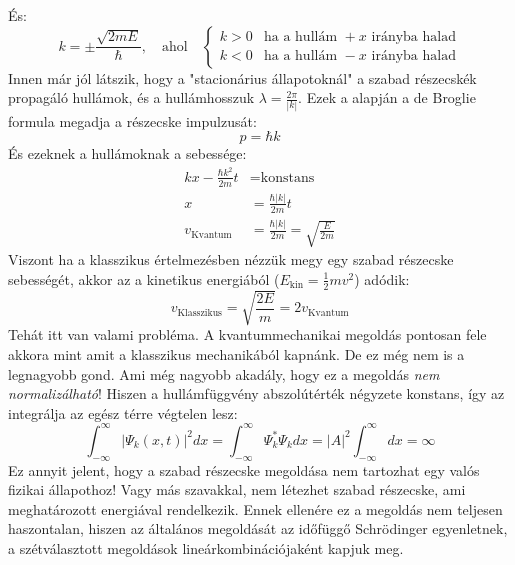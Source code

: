 \documentclass[../main.tex]{subfiles}
\begin{document}
És:
 \begin{equation}
    k =  \pm \frac{\sqrt{2mE}}{\hbar}, \quad \text{ahol} \quad \begin{cases}
    k > 0 & \text{ha a hullám } +x \text{ irányba halad} \\
    k < 0 & \text{ha a hullám } -x \text{ irányba halad}
    \end{cases}
 \end{equation}
Innen már jól látszik, hogy a "stacionárius állapotoknál" a szabad részecskék propagáló hullámok, és a hullámhosszuk $\lambda = \frac{2 \pi}{|k|}$.
Ezek a alapján a de Broglie formula megadja a részecske impulzusát:
\begin{equation}
    p = \hbar k
\end{equation}
És ezeknek a hullámoknak a sebessége:
\begin{equation}
    \begin{aligned}
        kx - \frac{\hbar k^2}{2m}t &= \text{konstans} \\
        x &= \frac{\hbar |k|}{2m} t \\
        v_{\text{Kvantum}} &= \frac{\hbar |k|}{2m} = \sqrt{\frac{E}{2m}}
    \end{aligned}
\end{equation}
Viszont ha a klasszikus értelmezésben nézzük megy egy szabad részecske sebességét, akkor az a kinetikus energiából ($E_{\text{kin}} = \frac{1}{2} m v^2$) adódik:
\begin{equation}
    v_{\text{Klasszikus}} = \sqrt{\frac{2E}{m}} = 2 v_{\text{Kvantum}}
\end{equation}
Tehát itt van valami probléma. A kvantummechanikai megoldás pontosan fele akkora mint amit a klasszikus mechanikából kapnánk. De ez még nem is a legnagyobb gond. Ami még nagyobb akadály,
hogy ez a megoldás \textit{nem normalizálható}! Hiszen a hullámfüggvény abszolútérték négyzete konstans, így az integrálja az egész térre végtelen lesz:
\begin{equation}
    \int_{-\infty}^{\infty} |\Psi_k(x,t)|^2 dx = \int_{-\infty}^{\infty} \Psi_k^* \Psi_k dx = |A|^2 \int_{-\infty}^{\infty} dx = \infty
\end{equation}
Ez annyit jelent, hogy a szabad részecske megoldása nem tartozhat egy valós fizikai állapothoz! Vagy más szavakkal, nem létezhet szabad részecske, ami meghatározott energiával rendelkezik.
Ennek ellenére ez a megoldás nem teljesen haszontalan, hiszen az általános megoldását az időfüggő Schrödinger egyenletnek, a szétválasztott megoldások lineárkombinációjaként kapjuk meg.
\end{document}
